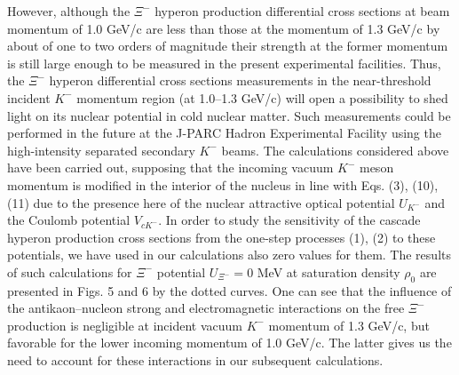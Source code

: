\documentclass[12pt]{article}
\begin{document}
However, although the $\Xi^-$ hyperon production differential cross sections at beam momentum of 1.0 GeV/c
are less than those at the momentum of 1.3 GeV/c by about of one to two orders of magnitude their strength
at the former momentum is still large enough to be measured in the present experimental facilities.
Thus, the $\Xi^-$ hyperon differential
cross sections measurements in the near-threshold incident $K^-$ momentum region (at 1.0--1.3 GeV/c) will open
a possibility to shed light on its nuclear potential in cold nuclear matter.
Such measurements could be performed in the future at the J-PARC Hadron Experimental Facility
using the high-intensity separated secondary $K^-$ beams. The calculations considered above have been carried out,
supposing that the incoming vacuum $K^-$ meson momentum is modified in the interior of the nucleus in line with
Eqs. (3), (10), (11) due to the presence here of the nuclear attractive optical potential $U_{K^-}$ and the
Coulomb potential $V_{cK^-}$. In order to study the sensitivity of the cascade hyperon production cross sections
from the one-step processes (1), (2) to these potentials, we have used in our calculations also zero values for them.
The results of such calculations for $\Xi^-$ potential $U_{\Xi^-}=0$ MeV at saturation density $\rho_0$
are presented in Figs. 5 and 6 by the dotted curves. One can see that the influence
of the antikaon--nucleon strong and electromagnetic interactions on the free $\Xi^-$ production is negligible at
incident vacuum $K^-$ momentum of 1.3 GeV/c, but favorable for the lower incoming momentum of 1.0 GeV/c.
The latter gives us the need to account for these interactions in our subsequent calculations.
\end{document}
